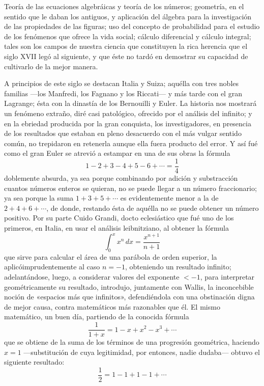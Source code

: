 \documentclass[a4paper, 12pt, draft]{article}
\begin{document}
{%

Teoría de las ecuaciones algebráicas y teoría de los números; geometría, en el sentido que le daban los antiguos, y aplicación del álgebra para la investigación de las propiedades de las figuras; uso del concepto de probabilidad para el estudio de los fenómenos que ofrece la vida social; cálculo diferencial y cálculo integral; tales son los campos de nuestra ciencia que constituyen la rica herencia que el siglo XVII legó al siguiente, y que éste no tardó en demostrar su capacidad de cultivarlo de la mejor manera.

A principios de este siglo se destacan Italia y Suiza; aquélla con tres nobles familias ---los Manfredi, los Fagnano y los Riccati--- y más tarde con el gran Lagrange; ésta con la dinastía de los Bernouilli y Euler. La historia nos mostrará un fenómeno extraño, diré casi patológico, ofrecido por el análisis del infinito; y en la ebriedad producida por la gran conquista, los investigadores, en presencia de los resultados que estaban en pleno desacuerdo
con el más vulgar sentido común, no trepidaron en retenerla aunque ella fuera producto del error. Y así fué como el gran Euler se atrevió a estampar
en una de sus obras la fórmula
$$
1-2+3-4+5-6+ \cdots = \frac{1}{4}
$$
	doblemente absurda, ya sea porque combinando por adición y substracción cuantos números enteros se quieran, no se puede llegar a un número fraccionario; ya sea porque la suma $1+3+5+\cdots$ es evidentemente menor a la de $2 + 4 +6+\cdots$, de donde, restando ésta de aquélla no se puede obtener un número positivo. Por su parte Cuido Grandi, docto eclesiástico que fué uno de los primeros, en Italia, en usar el análisis leibnitziano, al obtener la fórmula
	$$
	\int_0^x x^n \, dx = \frac{x^{n+1}}{n+1}
	$$
que sirve para calcular el área de una parábola de orden superior, la aplicó\linebreak imprudentemente al caso $n = -1$, obteniendo un resultado infinito; adelantándose, luego, a considerar valores del exponente $< - 1$, para interpretar geométricamente su resultado, introdujo, juntamente con Wallis, la inconcebible noción de «espacios más que infinitos», defendiéndola con una obstinación digna de mejor causa, contra matemáticos más razonables que él. El mismo matemático, un buen día, partiendo de la conocida fórmula
$$
\frac{1}{1+x}= 1-x+x^2-x^3+\cdots
$$
que se obtiene de la suma de los términos de una progresión geométrica, haciendo $x = 1$ ---substitución de cuya legitimidad, por entonces, nadie dudaba--- obtuvo el siguiente resultado:
$$
\frac{1}{2}= 1-1+1-1+\cdots
$$

}
\end{document}

